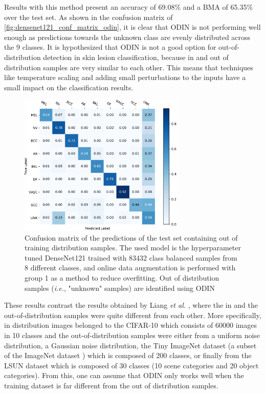         Results with this method present an accuracy of 69.08\% and a \ac{BMA} of 65.35\% over the test set. As shown in the confusion matrix of \autoref{fig:densenet121_conf_matrix_odin}, it is clear that \ac{ODIN} is not performing well enough as predictions towards the unknown class are evenly distributed across the 9 classes. It is hypothesized that ODIN is not a good option for out-of-distribution detection in skin lesion classification, because in and out of distribution samples are very similar to each other. This means that techniques like temperature scaling and adding small perturbations to the inputs have a small impact on the classification results. \par 
        \begin{figure}[ht]
            \centering
            \includegraphics[width=0.7\textwidth]{figs/densenet121_conf_matrix_odin.pdf}
            \caption[Confusion matrix of the test set predictions on the hyperparameter tuned DenseNet121 trained with 8 classes where out of distribution samples are identified using the \ac{ODIN} detector.]{Confusion matrix of the predictions of the test set containing out of training distribution samples. The used model is the hyperparameter tuned DenseNet121 trained with 83432 class balanced samples from 8 different classes, and online data augmentation is performed with group 1 as a method to reduce overfitting. Out of distribution samples (\textit{i.e.}, "unknown" samples) are identified using \ac{ODIN} \cite{odin}}
            \label{fig:densenet121_conf_matrix_odin}
        \end{figure}
        
        These results contrast the results obtained by Liang \textit{et al.} \cite{odin}, where the in and the out-of-distribution samples were quite different from each other. More specifically, in distribution images belonged to the CIFAR-10 \cite{Krizhevskya} which consists of 60000 images in 10 classes and the out-of-distribution samples were either from a uniform noise distribution, a Gaussian noise distribution, the Tiny ImageNet dataset (a subset of the ImageNet dataset \cite{Deng2010}) which is composed of 200 classes, or finally from the LSUN dataset \cite{Yu2015} which is composed of 30 classes (10 scene categories and 20 object categories). From this, one can assume that \ac{ODIN} only works well when the training dataset is far different from the out of distribution samples. \par 
        
